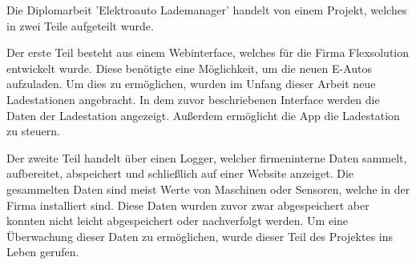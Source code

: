 Die Diplomarbeit 'Elektroauto Lademanager' handelt von einem Projekt, welches in zwei Teile aufgeteilt wurde.

Der erste Teil besteht aus einem Webinterface, welches für die Firma Flexsolution entwickelt wurde. Diese benötigte eine Möglichkeit, um die neuen E-Autos aufzuladen. Um dies zu ermöglichen, wurden im Unfang dieser Arbeit neue Ladestationen angebracht. In dem zuvor beschriebenen Interface werden die Daten der Ladestation angezeigt. Außerdem ermöglicht die App die Ladestation zu steuern.

Der zweite Teil handelt über einen Logger, welcher firmeninterne Daten sammelt, aufbereitet, abspeichert und schließlich auf einer Website anzeiget. Die gesammelten Daten sind meist Werte von Maschinen oder Sensoren, welche in der Firma installiert sind. Diese Daten wurden zuvor zwar abgespeichert aber konnten nicht leicht abgespeichert oder nachverfolgt werden. Um eine Überwachung dieser Daten zu ermöglichen, wurde dieser Teil des Projektes ins Leben gerufen.
